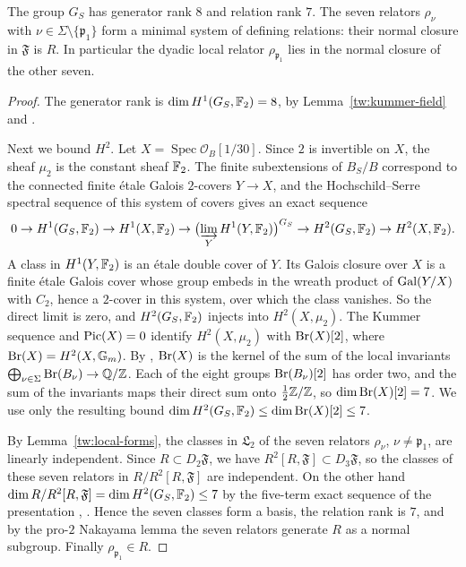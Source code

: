 \begin{lemma}\label{tw:complete-global-presentation}
The group $G_S$ has generator rank $8$ and relation rank $7$. The
seven relators $\rho_\nu$ with $\nu\in\Sigma\setminus\{\mathfrak p_1\}$ form
a minimal system of defining relations: their normal closure in
$\mathfrak F$ is $R$. In particular the dyadic local relator
$\rho_{\mathfrak p_1}$ lies in the normal closure of the other seven.
\end{lemma}

\begin{proof}
The generator rank is $\dim H^1(G_S,\mathbb F_2)=8$, by
Lemma~\ref{tw:kummer-field} and
\cite[Proposition~3.9.1]{NeukirchSchmidtWingberg2008}.

Next we bound $H^2$. Let $X=\operatorname{Spec}\mathcal O_B[1/30]$. Since
$2$ is invertible on $X$, the sheaf $\mu_2$ is the constant sheaf $\mathbb F_2$.
The finite subextensions of $B_S/B$ correspond to the connected finite étale
Galois $2$-covers $Y\to X$, and the Hochschild--Serre spectral sequence of
this system of covers \cite[Theorem~14.9 and Remark~14.10]{MilneEtale} gives an exact
sequence
\[
 0\to H^1(G_S,\mathbb F_2)\to H^1(X,\mathbb F_2)\to
 \bigl(\varinjlim_Y H^1(Y,\mathbb F_2)\bigr)^{G_S}\to
 H^2(G_S,\mathbb F_2)\to H^2(X,\mathbb F_2).
\]
A class in $H^1(Y,\mathbb F_2)$ is an étale double cover of $Y$. Its Galois closure
over $X$ is a finite étale Galois cover whose group embeds in the wreath
product of $\operatorname{Gal}(Y/X)$ with $C_2$, hence a $2$-cover in this system, over which
the class vanishes. So the direct limit is zero, and
$H^2(G_S,\mathbb F_2)$ injects into $H^2(X,\mu_2)$. The Kummer sequence and
$\operatorname{Pic}(X)=0$ identify $H^2(X,\mu_2)$ with $\operatorname{Br}(X)[2]$, where
$\operatorname{Br}(X)=H^2(X,\mathbb G_m)$. By \cite[Theorem~6.8.3 and
Example~6.9.4]{Poonen}, $\operatorname{Br}(X)$ is the kernel of the sum of the local
invariants $\bigoplus_{\nu\in\Sigma}\operatorname{Br}(B_\nu)\to\mathbb Q/\mathbb Z$. Each of the eight
groups $\operatorname{Br}(B_\nu)[2]$ has order two, and the sum of the invariants maps their
direct sum onto $\frac12\mathbb Z/\mathbb Z$, so $\dim\operatorname{Br}(X)[2]=7$. We use only the
resulting bound $\dim H^2(G_S,\mathbb F_2)\le\dim\operatorname{Br}(X)[2]\le7$.

By Lemma~\ref{tw:local-forms}, the classes in $\mathfrak L_2$ of the seven
relators $\rho_\nu$, $\nu\ne\mathfrak p_1$, are linearly independent. Since
$R\subset D_2\mathfrak F$, we have $R^2[R,\mathfrak F]\subset D_3\mathfrak F$, so
the classes of these seven relators in $R/R^2[R,\mathfrak F]$ are independent.
On the other hand
$\dim R/R^2[R,\mathfrak F]=\dim H^2(G_S,\mathbb F_2)\le7$ by the five-term
exact sequence of the presentation
\cite[Proposition~3.9.5]{NeukirchSchmidtWingberg2008},
\cite[(3.3)--(3.4)]{Quadrelli2021}. Hence the seven classes form a basis, the
relation rank is $7$, and by the pro-$2$ Nakayama lemma
\cite[Corollary~3.9.3]{NeukirchSchmidtWingberg2008} the seven relators
generate $R$ as a normal subgroup. Finally $\rho_{\mathfrak p_1}\in R$.
\end{proof}

